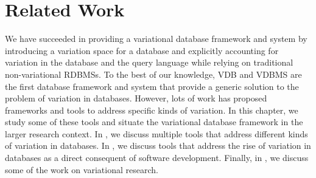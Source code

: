 \chapter{Related Work}
\label{ch:rw}


We have succeeded in providing a variational database framework and system by 
introducing a variation space for a database and explicitly accounting for variation in 
the database and the query language while relying on traditional non-variational RDBMSs.
To the best of our knowledge, VDB and VDBMS are the first database framework and
system that provide a generic solution to the problem of variation in databases. 
%
However, lots of work has proposed frameworks and tools to address specific kinds of
variation. In this chapter, we study some of these tools and situate the variational 
database framework in the larger research context. 
%
In , we discuss multiple tools that address different kinds
of variation in databases.
%
In , we discuss tools that address the rise of variation in
databases as a direct consequent of software development.
%
Finally, in , we discuss some of the work on variational research.











